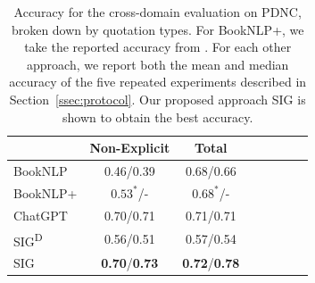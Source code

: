\documentclass[letterpaper]{article} %
\begin{document}
\begin{table}[htbp!]

    \centering
    \begin{tabular}{l|c c c c c c c}
    \toprule
         & \bf Non-Explicit & \bf Total\\
       \midrule
        BookNLP  & 0.46/0.39 & 0.68/0.66 & \\
        BookNLP+ & $0.53^{*}$/-  & $0.68^{*}$/- \\
        \midrule
        ChatGPT  & 0.70/0.71 & 0.71/0.71\\
        \midrule
        SIG\textsuperscript{D} & 0.56/0.51 & 0.57/0.54\\
        SIG & \textbf{0.70}/\textbf{0.73} & \textbf{0.72}/\textbf{0.78} \\
        \bottomrule
    \end{tabular}
    \caption{Accuracy for the cross-domain evaluation on PDNC, broken down by quotation types. For BookNLP+, we take the reported accuracy from \citet{DBLP:conf/acl/VishnubhotlaRHH23}. For each other approach, we report both the mean and median accuracy of the five repeated experiments described in Section~\ref{ssec:protocol}. Our proposed approach SIG is shown to obtain the best accuracy.}
    \label{tab:cross-fiction-2}
\end{table}
\end{document}
